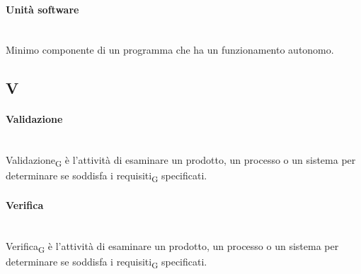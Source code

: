 \paragraph{Unità software}~\smallskip \\
Minimo componente di un programma che ha un funzionamento autonomo.
\newpage
{}
\subsection*{V}
\paragraph{Validazione}~\smallskip \\
Validazione\textsubscript{G} è l'attività di esaminare un prodotto, un processo o un sistema per determinare se soddisfa i requisiti\textsubscript{G} specificati.

\paragraph{Verifica}~\smallskip \\
Verifica\textsubscript{G} è l'attività di esaminare un prodotto, un processo o un sistema per determinare se soddisfa i requisiti\textsubscript{G} specificati.




